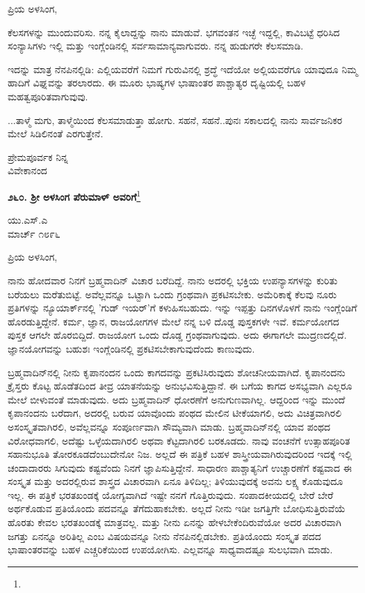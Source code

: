 \noindent
ಪ್ರಿಯ ಅಳಸಿಂಗ,

ಕೆಲಸಗಳನ್ನು ಮುಂದುವರಿಸು. ನನ್ನ ಕೈಲಾದ್ದನ್ನು ನಾನು ಮಾಡುವೆ. ಭಗವಂತನ ಇಚ್ಛೆ ಇದ್ದಲ್ಲಿ, ಕಾವಿಬಟ್ಟೆ ಧರಿಸಿದ ಸಂನ್ಯಾಸಿಗಳು ಇಲ್ಲಿ ಮತ್ತು ಇಂಗ್ಲೆಂಡಿನಲ್ಲಿ ಸರ್ವಸಾಮಾನ್ಯವಾಗುವರು. ನನ್ನ ಹುಡುಗರೇ ಕೆಲಸಮಾಡಿ.

ಇದನ್ನು ಮಾತ್ರ ನೆನಪಿನಲ್ಲಿಡಿ: ಎಲ್ಲಿಯವರೆಗೆ ನಿಮಗೆ ಗುರುವಿನಲ್ಲಿ ಶ್ರದ್ಧೆ ಇದೆಯೋ ಅಲ್ಲಿಯವರೆಗೂ ಯಾವುದೂ ನಿಮ್ಮ ಹಾದಿಗೆ ವಿಘ್ನವನ್ನು ತರಲಾರದು. ಈ ಮೂರು ಭಾಷ್ಯಗಳ ಭಾಷಾಂತರ ಪಾಶ್ಚಾತ್ಯರ ದೃಷ್ಟಿಯಲ್ಲಿ ಬಹಳ ಮಹತ್ವಪೂರಿತವಾಗುವುವು.

...ತಾಳ್ಮೆ ಮಗು, ತಾಳ್ಮೆಯಿಂದ ಕೆಲಸಮಾಡುತ್ತಾ ಹೋಗು. ಸಹನೆ, ಸಹನೆ..ಪುನಃ ಸಕಾಲದಲ್ಲಿ ನಾನು ಸಾರ್ವಜನಿಕರ ಮೇಲೆ ಸಿಡಿಲಿನಂತೆ ಎರಗುತ್ತೇನೆ.

{\flushright
ಪ್ರೇಮಪೂರ್ವಕ ನಿನ್ನ\\ವಿವೇಕಾನಂದ\par}

\begin{center}
\textbf{೨೬೦. ಶ‍್ರೀ ಅಳಸಿಂಗ ಪೆರುಮಾಳ್ ಅವರಿಗೆ}\footnote{}
\end{center}

\begin{flushright}
ಯು.ಎಸ್.ಎ\\ಮಾರ್ಚ್ ೧೮೯೬
\end{flushright}

\noindent
ಪ್ರಿಯ ಅಳಸಿಂಗ,

ನಾನು ಹೋದವಾರ ನಿನಗೆ ಬ್ರಹ್ಮವಾದಿನ್ ವಿಚಾರ ಬರೆದಿದ್ದೆ. ನಾನು ಅದರಲ್ಲಿ ಭಕ್ತಿಯ ಉಪನ್ಯಾಸಗಳನ್ನು ಕುರಿತು ಬರೆಯಲು ಮರೆತುಬಿಟ್ಟೆ. ಅವೆಲ್ಲವನ್ನೂ ಒಟ್ಟಾಗಿ ಒಂದು ಗ್ರಂಥವಾಗಿ ಪ್ರಕಟಿಸಬೇಕು. ಅಮೆರಿಕಾಕ್ಕೆ ಕೆಲವು ನೂರು ಪ್ರತಿಗಳನ್ನು ನ್ಯೂಯಾರ್ಕ್‌ನಲ್ಲಿ 'ಗುಡ್ ಇಯರ್'ಗೆ ಕಳುಹಿಸಬಹುದು. ಇನ್ನು ಇಪ್ಪತ್ತು ದಿನಗಳೊಳಗೆ ನಾನು ಇಂಗ್ಲೆಂಡಿಗೆ ಹೊರಡುತ್ತಿದ್ದೇನೆ. ಕರ್ಮ, ಜ್ಞಾನ, ರಾಜಯೋಗಗಳ ಮೇಲೆ ನನ್ನ ಬಳಿ ದೊಡ್ಡ ಪುಸ್ತಕಗಳೇ ಇವೆ. ಕರ್ಮಯೋಗದ ಪುಸ್ತಕ ಆಗಲೇ ಹೊರಬಿದ್ದಿದೆ. ರಾಜಯೋಗ ಒಂದು ದೊಡ್ಡ ಗ್ರಂಥವಾಗುವುದು. ಅದು ಈಗಾಗಲೇ ಮುದ್ರಣದಲ್ಲಿದೆ. ಜ್ಞಾನಯೋಗವನ್ನು ಬಹುಶಃ ಇಂಗ್ಲೆಂಡಿನಲ್ಲಿ ಪ್ರಕಟಿಸಬೇಕಾಗುವುದೆಂದು ಕಾಣುವುದು.

ಬ್ರಹ್ಮವಾದಿನ್‌ನಲ್ಲಿ ನೀನು ಕೃಪಾನಂದನ ಒಂದು ಕಾಗದವನ್ನು ಪ್ರಕಟಿಸಿರುವುದು ಶೋಚನೀಯವಾಗಿದೆ. ಕೃಪಾನಂದನು ಕ್ರೈಸ್ತರು ಕೊಟ್ಟ ಹೊಡೆತದಿಂದ ತೀವ್ರ ಯಾತನೆಯನ್ನು ಅನುಭವಿಸುತ್ತಿದ್ದಾನೆ. ಈ ಬಗೆಯ ಕಾಗದ ಅಸಭ್ಯವಾಗಿ ಎಲ್ಲರೂ ಮೇಲೆ ಬೀಳುವಂತೆ ಮಾಡುವುದು. ಅದು ಬ್ರಹ್ಮವಾದಿನ್ ಧೋರಣೆಗೆ ಅನುಗುಣವಾಗಿಲ್ಲ. ಆದ್ದರಿಂದ ಇನ್ನು ಮುಂದೆ ಕೃಪಾನಂದನು ಬರೆದಾಗ, ಅದರಲ್ಲಿ ಬರುವ ಯಾವೊಂದು ಪಂಥದ ಮೇಲಿನ ಟೀಕೆಯಾಗಲಿ, ಅದು ವಿಚಿತ್ರವಾಗಿರಲಿ ಅಸಂಸ್ಕೃತವಾಗಿರಲಿ, ಅವೆಲ್ಲವನ್ನೂ ಸಂಪೂರ್ಣವಾಗಿ ಸೌಮ್ಯವಾಗಿ ಮಾಡು. ಬ್ರಹ್ಮವಾದಿನ್‌ನಲ್ಲಿ ಯಾವ ಪಂಥದ ವಿರೋಧವಾಗಲಿ, ಅದೆಷ್ಟು ಒಳ್ಳೆಯದಾಗಿರಲಿ ಅಥವಾ ಕೆಟ್ಟದಾಗಿರಲಿ ಬರಕೂಡದು. ನಾವು ವಂಚನೆಗೆ ಉತ್ಸಾಹಪೂರಿತ ಸಹಾನುಭೂತಿ ತೋರಕೂಡದೆಂಬುದೇನೋ ನಿಜ. ಅಲ್ಲದೆ ಈ ಪತ್ರಿಕೆ ಬಹಳ ಶಾಸ್ತ್ರೀಯವಾಗಿರುವುದರಿಂದ ಇದಕ್ಕೆ ಇಲ್ಲಿ ಚಂದಾದಾರರು ಸಿಗುವುದು ಕಷ್ಟವೆಂದು ನಿನಗೆ ಜ್ಞಾಪಿಸುತ್ತಿದ್ದೇನೆ. ಸಾಧಾರಣ ಪಾಶ್ಚಾತ್ಯನಿಗೆ ಉಚ್ಚಾರಣೆಗೆ ಕಷ್ಟವಾದ ಈ ಸಂಸ್ಕೃತ ಮತ್ತು ಅದರಲ್ಲಿರುವ ಶಾಸ್ತ್ರದ ವಿಚಾರವಾಗಿ ಏನೂ ತಿಳಿದಿಲ್ಲ; ತಿಳಿಯುವುದಕ್ಕೆ ಅವನು ಲಕ್ಷ್ಯ ಕೊಡುವುದೂ ಇಲ್ಲ. ಈ ಪತ್ರಿಕೆ ಭರತಖಂಡಕ್ಕೆ ಯೋಗ್ಯವಾಗಿದೆ\enginline{-} ಇಷ್ಟೇ ನನಗೆ ಗೊತ್ತಿರುವುದು. ಸಂಪಾದಕೀಯದಲ್ಲಿ ಬೇರೆ ಬೇರೆ ಅರ್ಥಕೊಡುವ ಪ್ರತಿಯೊಂದು ಪದವನ್ನೂ ತೆಗೆದುಹಾಕಬೇಕು. ಅಲ್ಲದೆ ನೀನು ಇಡೀ ಜಗತ್ತಿಗೇ ಬೋಧಿಸುತ್ತಿರುವೆಯೆ ಹೊರತು ಕೇವಲ ಭರತಖಂಡಕ್ಕೆ ಮಾತ್ರವಲ್ಲ. ಮತ್ತು ನೀನು ಏನನ್ನು ಹೇಳಬೇಕೆಂದಿರುವೆಯೋ ಅದರ ವಿಚಾರವಾಗಿ ಜಗತ್ತು ಏನನ್ನೂ ಅರಿತಿಲ್ಲ ಎಂಬ ವಿಷಯವನ್ನೂ ನೀನು ನೆನಪಿನಲ್ಲಿಡಬೇಕು. ಪ್ರತಿಯೊಂದು ಸಂಸ್ಕೃತ ಪದದ ಭಾಷಾಂತರವನ್ನು ಬಹಳ ಎಚ್ಚರಿಕೆಯಿಂದ ಉಪಯೋಗಿಸು. ಎಲ್ಲವನ್ನೂ ಸಾಧ್ಯವಾದಷ್ಟೂ ಸುಲಭವಾಗಿ ಮಾಡು.

